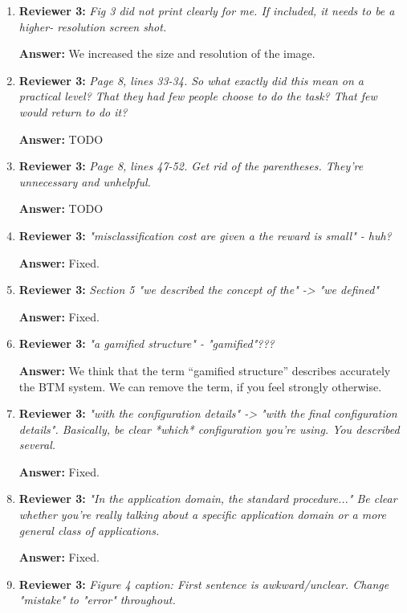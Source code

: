 \documentclass[letterpaper]{article}
\begin{document}
\begin{enumerate}
\item \textbf{Reviewer 3:} \emph{ Fig 3 did not print clearly for me.  If included, it needs to be a higher- resolution screen shot.}

\textbf{Answer:} We increased the size and resolution of the image.

\item \textbf{Reviewer 3:} \emph{ Page 8, lines 33-34.  So what exactly did this mean on a practical level? That they had few people choose to do the task?  That few would return to do it?}

\textbf{Answer:} TODO

\item \textbf{Reviewer 3:} \emph{ Page 8, lines 47-52.  Get rid of the parentheses.  They're unnecessary and unhelpful.}

\textbf{Answer:} TODO

\item \textbf{Reviewer 3:} \emph{ "misclassification cost are given a the reward is small" - huh?}

\textbf{Answer:} Fixed.

\item \textbf{Reviewer 3:} \emph{ Section 5 "we described the concept of the" -> "we defined"}

\textbf{Answer:} Fixed.

\item \textbf{Reviewer 3:} \emph{ "a gamified structure" - "gamified"???}

\textbf{Answer:} We think that the term ``gamified structure'' describes accurately the BTM system. We can remove the term, if you feel strongly otherwise.

\item \textbf{Reviewer 3:} \emph{ "with the configuration details" -> "with the final configuration details". Basically, be clear *which* configuration you're using.  You described several.}

\textbf{Answer:} Fixed.

\item \textbf{Reviewer 3:} \emph{ "In the application domain, the standard procedure..." Be clear whether you're really talking about a specific application domain or a more general class of applications.}

\textbf{Answer:} Fixed.

\item \textbf{Reviewer 3:} \emph{ Figure 4 caption: First sentence is awkward/unclear.  Change "mistake" to "error" throughout.}


\end{enumerate}
\end{document}
